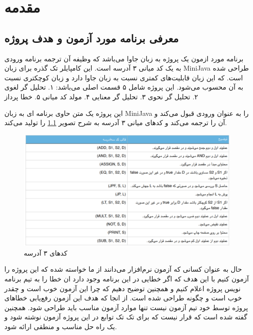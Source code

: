 
\chapter{مقدمه}
\section{معرفی برنامه مورد آزمون و هدف پروژه}

برنامه مورد ازمون یک پروژه به زبان جاوا می‌باشد که وظیفه آن ترجمه برنامه ورودی به یک کد میانی ۳ آدرسه است. این کامپایلر تک گذره برای زبان MiniJava طراحی شده است. که این زبان قابلیت‌های کمتری نسبت به زبان جاوا دارد و زبان کوچکتری نسبت به آن محسوب می‌شود. این پروژه شامل ۵ قسمت اصلی می‌باشد: ۱. تحلیل گر لغوی ۲. تحلیل گر نحوی ۳. تحلیل گر معنایی ۴. مولد کد میانی  ۵. خطا پرداز 

این پروژه یک متن حاوی برنامه ای به زبان MiniJava را به عنوان ورودی قبول می‌کند و آن را ترجمه می‌کند و کد‌های میانی ۳ آدرسه به شرح تصویر \ref{fig:1} را تولید می‌کند.

\begin{figure}[ht]
\centering
\includegraphics[scale=0.8]{3add.PNG}
\caption{کد‌های ۳ آدرسه}
\label{fig:1}
\end{figure}



حال به عنوان کسانی که آزمون نرم‌افزار می‌دانند از ما خواسته شده که این پروژه را آزمون کنیم با این هدف که اگر خطایی در این برنامه وجود دارد ان خطا را به تیم برنامه نویس پروژه اعلام کنیم و همچنین توضیح دهیم که چرا این آزمون خوب است و چقدر خوب است و چگونه طراحی شده است.
از انجا که هدف این آزمون رفع‌یابی خطاهای پروژه توسط خود تیم آزمون نیست تنها موارد آزمون مناسب باید طراحی شود.
همچنین گفته شده است که قرار نیست که برای تک تک توابع در این پروژه آزمون نوشته شود و یک راه حل مناسب و منطقی ارائه شود. 

